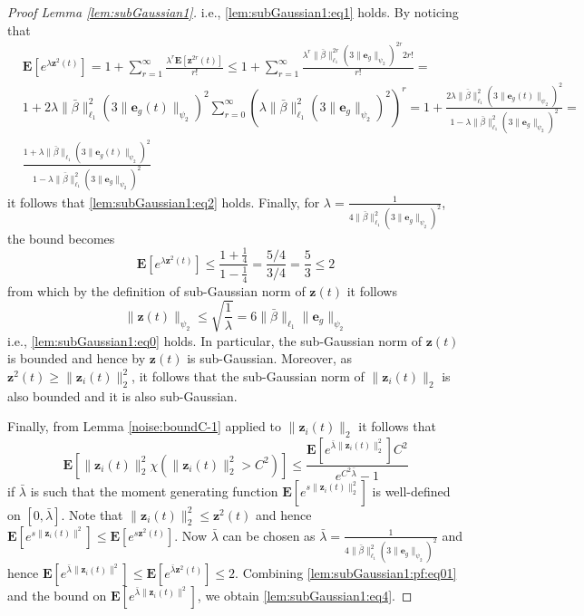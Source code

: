\documentclass{article}
\newcommand{\e}{\mathbf{e}}
\newcommand{\z}{\mathbf{z}}
\newcommand{\bE}{\mathbf{E}}
\begin{document}
\begin{proof}[Proof Lemma \ref{lem:subGaussian1}]
  i.e., \eqref{lem:subGaussian1:eq1} holds.
  By noticing that
  \begin{align*}
     & \bE[e^{\lambda \z^2(t)}]=1+\sum_{r=1}^{\infty} \frac{\lambda^r \bE[\z^{2r}(t)]}{r!} \le 1+\sum_{r=1}^{\infty} \frac{\lambda^r \|\bar{\beta}\|_{\ell_1}^{2r} (3\|\e_g\|_{\psi_2})^{2r} 2r!}{r!} = \\
     &  1+ 2\lambda \|\bar{\beta}\|_{\ell_1}^2(3\|\e_g(t)\|_{\psi_2})^2 \sum_{r=0}^{\infty} (\lambda \|\bar{\beta}\|_{\ell_1}^2 (3\|\e_g\|_{\psi_2})^2)^r =
      1 + \frac{2 \lambda \|\bar{\beta}\|_{\ell_1}^2(3\|\e_g(t)\|_{\psi_2})^2}{1- \lambda \|\bar{\beta}\|_{\ell_1}^2 (3\|\e_g\|_{\psi_2})^2}= \\
      & \frac{1+\lambda \|\bar{\beta}\|_{\ell_1}(3\|\e_g(t)\|_{\psi_2})^2}{1- \lambda \|\bar{\beta}\|_{\ell_1}^2 (3\|\e_g\|_{\psi_2})^2}
\end{align*}
it follows that \eqref{lem:subGaussian1:eq2} holds. 
Finally, for $\lambda = \frac{1}{4\|\bar{\beta}\|_{\ell_1}^2 (3\|\e_g\|_{\psi_2})^2}$, the bound becomes
\[
\bE[e^{\lambda \z^2(t)}] \le \frac{1+\frac{1}{4}}{1-\frac{1}{4}} = \frac{5/4}{3/4} = \frac{5}{3} \le 2
\]
from which by the definition of sub-Gaussian norm of $\z(t)$ it follows
\[
\|\z(t)\|_{\psi_2} \le \sqrt{\frac{1}{\lambda}} = 6\|\bar{\beta}\|_{\ell_1} \|\e_g\|_{\psi_2}
\]
i.e., \eqref{lem:subGaussian1:eq0} holds.
In particular, the sub-Gaussian norm of $\z(t)$ is bounded
and hence by \cite[Proposition 2.6.1]{vershynin2026highdimensional} 
$\z(t)$ is sub-Gaussian. Moreover, as 
$\z^2(t) \ge \|\z_i(t)\|_2^2$, it follows that the sub-Gaussian norm of
$\|\z_i(t)\|_2$ is also bounded and  it is also sub-Gaussian. 

Finally, from Lemma \ref{noise:boundC-1} applied to $\|\z_i(t)\|_2$
it follows that 
\begin{equation}
   \label{lem:subGaussian1:pf:eq01} 
\bE[\|\z_i(t)\|_2^2 \chi(\|\z_i(t)\|_2^2 > C^2)] \le 
\frac{\bE[e^{\bar{\lambda}\|\z_i(t)\|_2^2}]C^2}{e^{C^2\bar{\lambda}}-1}
\end{equation}
if $\bar{\lambda}$ is such that the moment generating function 
$\bE[e^{s\|\z_i(t)\|_2^2}]$ is well-defined on $[0,\bar{\lambda}]$.
Note that $\|\z_i(t)\|^2_2 \le \z^2(t)$ and hence 
$\bE[e^{s\|\z_i(t)\|^2}] \le \bE[e^{s\z^2(t)}]$. Now  $\bar{\lambda}$ can be chosen as $\bar{\lambda}=\frac{1}{4\|\bar{\beta}\|_{\ell_1}^2 (3\|\e_g\|_{\psi_2})^2}$
and hence $\bE[e^{\bar{\lambda}\|\z_i(t)\|^2}] \le \bE[e^{\bar{\lambda}\z^2(t)}] \le 2$.  Combining \eqref{lem:subGaussian1:pf:eq01} and the bound on $\bE[e^{\bar{\lambda}\|\z_i(t)\|^2}]$, we obtain \eqref{lem:subGaussian1:eq4}.
\end{proof}
\end{document}

